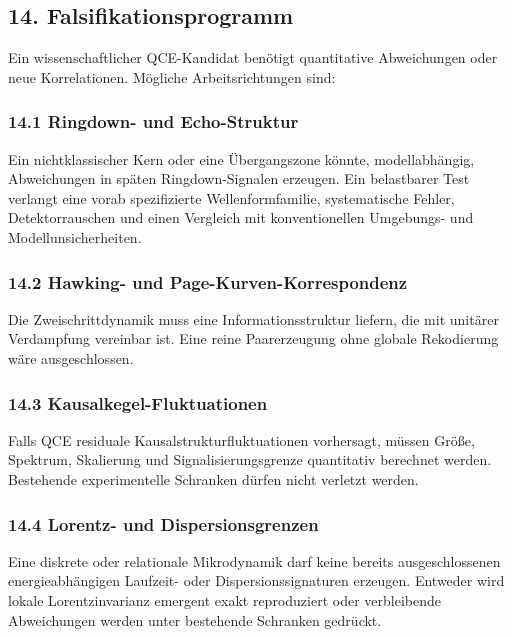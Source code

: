 \documentclass[
  11pt,
  a4paper,
]{article}
\begin{document}
\subsection{14. Falsifikationsprogramm}\label{falsifikationsprogramm}

Ein wissenschaftlicher QCE-Kandidat benötigt quantitative Abweichungen
oder neue Korrelationen. Mögliche Arbeitsrichtungen sind:

\subsubsection{14.1 Ringdown- und
Echo-Struktur}\label{ringdown--und-echo-struktur}

Ein nichtklassischer Kern oder eine Übergangszone könnte,
modellabhängig, Abweichungen in späten Ringdown-Signalen erzeugen. Ein
belastbarer Test verlangt eine vorab spezifizierte Wellenformfamilie,
systematische Fehler, Detektorrauschen und einen Vergleich mit
konventionellen Umgebungs- und Modellunsicherheiten.

\subsubsection{14.2 Hawking- und
Page-Kurven-Korrespondenz}\label{hawking--und-page-kurven-korrespondenz}

Die Zweischrittdynamik muss eine Informationsstruktur liefern, die mit
unitärer Verdampfung vereinbar ist. Eine reine Paarerzeugung ohne
globale Rekodierung wäre ausgeschlossen.

\subsubsection{14.3
Kausalkegel-Fluktuationen}\label{kausalkegel-fluktuationen}

Falls QCE residuale Kausalstrukturfluktuationen vorhersagt, müssen
Größe, Spektrum, Skalierung und Signalisierungsgrenze quantitativ
berechnet werden. Bestehende experimentelle Schranken dürfen nicht
verletzt werden.

\subsubsection{14.4 Lorentz- und
Dispersionsgrenzen}\label{lorentz--und-dispersionsgrenzen}

Eine diskrete oder relationale Mikrodynamik darf keine bereits
ausgeschlossenen energieabhängigen Laufzeit- oder Dispersionssignaturen
erzeugen. Entweder wird lokale Lorentzinvarianz emergent exakt
reproduziert oder verbleibende Abweichungen werden unter bestehende
Schranken gedrückt.
\end{document}
